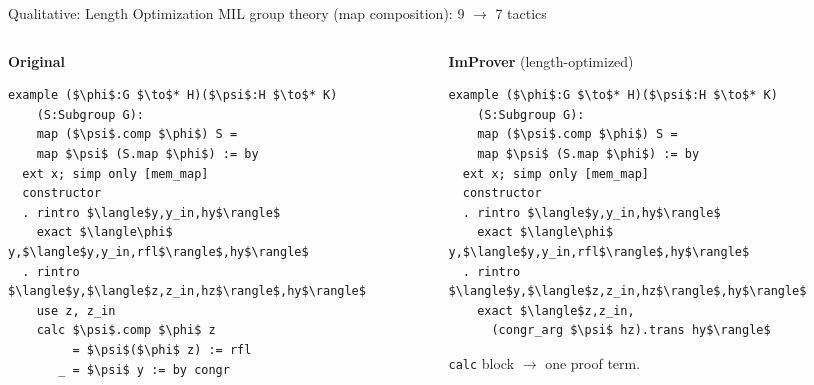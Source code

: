 \begin{frame}[fragile]{Qualitative: Length Optimization}
\vspace{0.3em}
{\small MIL group theory (map composition): 9 $\to$ 7 tactics}
\begin{columns}[T]
\begin{column}{0.49\textwidth}
\textbf{Original}
\begin{lstlisting}[basicstyle=\scriptsize\ttfamily]
example ($\phi$:G $\to$* H)($\psi$:H $\to$* K)
    (S:Subgroup G):
    map ($\psi$.comp $\phi$) S =
    map $\psi$ (S.map $\phi$) := by
  ext x; simp only [mem_map]
  constructor
  . rintro $\langle$y,y_in,hy$\rangle$
    exact $\langle\phi$ y,$\langle$y,y_in,rfl$\rangle$,hy$\rangle$
  . rintro $\langle$y,$\langle$z,z_in,hz$\rangle$,hy$\rangle$
    use z, z_in
    calc $\psi$.comp $\phi$ z
         = $\psi$($\phi$ z) := rfl
       _ = $\psi$ y := by congr
\end{lstlisting}
\end{column}
\begin{column}{0.49\textwidth}
\textbf{ImProver} (length-optimized)
\begin{lstlisting}[basicstyle=\scriptsize\ttfamily]
example ($\phi$:G $\to$* H)($\psi$:H $\to$* K)
    (S:Subgroup G):
    map ($\psi$.comp $\phi$) S =
    map $\psi$ (S.map $\phi$) := by
  ext x; simp only [mem_map]
  constructor
  . rintro $\langle$y,y_in,hy$\rangle$
    exact $\langle\phi$ y,$\langle$y,y_in,rfl$\rangle$,hy$\rangle$
  . rintro $\langle$y,$\langle$z,z_in,hz$\rangle$,hy$\rangle$
    exact $\langle$z,z_in,
      (congr_arg $\psi$ hz).trans hy$\rangle$
\end{lstlisting}
\vspace{0.3em}
\small \texttt{calc} block $\to$ one proof term.
\end{column}
\end{columns}
\end{frame}

